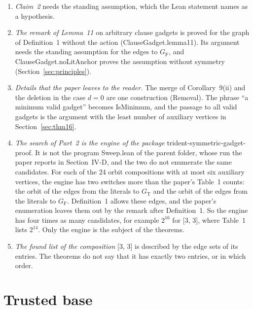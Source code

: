 \documentclass[11pt,a4paper]{article}
\newcommand{\leanus}{\textunderscore\allowbreak}
\newcommand{\lean}[1]{{\ttfamily\let\_\leanus #1}}
\newcommand{\GT}{G_{\mathrm{T}}}
\newcommand{\GF}{G_{\mathrm{F}}}
\begin{document}
\begin{enumerate}
(Section~\ref{sec:orbits}). Theorem~16 does not use it, and the proof of
Lemma~15 uses the literal neighbors of the two ends of an internal edge in
place of their fibers.
\item \emph{Claim~2} needs the standing assumption, which the Lean statement
names as a hypothesis.
\item \emph{The remark of Lemma~11} on arbitrary clause gadgets is proved
for the graph of Definition~1 without the action
(\lean{ClauseGadget.lemma11}). Its argument needs the standing assumption
for the edges to $\GF$, and \lean{ClauseGadget.noLitAnchor} proves the
assumption without symmetry (Section~\ref{sec:principles}).
\item \emph{Details that the paper leaves to the reader.} The merge of
Corollary~9(ii) and the deletion in the case $d=0$ are one construction
(\lean{Removal}). The phrase ``a minimum valid gadget'' becomes
\lean{IsMinimum}, and the passage to all valid gadgets is the argument with
the least number of auxiliary vertices in Section~\ref{sec:thm16}.
\item \emph{The search of Part~2 is the engine of the package}
\lean{trident-symmetric-gadget-proof}. It is not the program
\lean{Sweep.lean} of the parent folder, whose run the paper reports in
Section~IV-D, and the two do not enumerate the same candidates. For each of
the 24 orbit compositions with at most six auxiliary vertices, the engine has
two switches more than the paper's Table~1 counts: the orbit of the edges
from the literals to $\GT$ and the orbit of the edges from the literals to
$\GF$. Definition~1 allows these edges, and the paper's enumeration leaves
them out by the remark after Definition~1. So the engine has four times as
many candidates, for example $2^{16}$ for \lean{[3, 3]}, where Table~1 lists
$2^{14}$. Only the engine is the subject of the theorems.
\item \emph{The found list of the composition} \lean{[3, 3]} is described by
the edge sets of its entries. The theorems do not say that it has exactly
two entries, or in which order.
\end{enumerate}

\section{Trusted base}\label{sec:trust}
\end{document}
